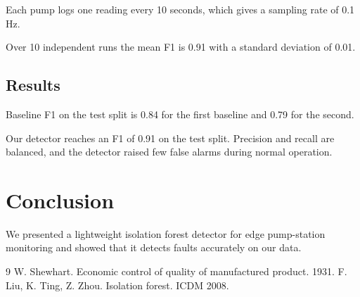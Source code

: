 \documentclass{article}
\begin{document}
Each pump logs one reading every 10 seconds, which gives a sampling rate of 0.1 Hz.

Over 10 independent runs the mean F1 is 0.91 with a standard deviation of 0.01.

\subsection{Results}
Baseline F1 on the test split is 0.84 for the first baseline and 0.79 for the second.

Our detector reaches an F1 of 0.91 on the test split. Precision and recall are balanced, and the detector raised few false alarms during normal operation.

\section{Conclusion}
We presented a lightweight isolation forest detector for edge pump-station monitoring and showed that it detects faults accurately on our data.

\begin{thebibliography}{9}
 W. Shewhart. Economic control of quality of manufactured product. 1931.
 F. Liu, K. Ting, Z. Zhou. Isolation forest. ICDM 2008.
\end{thebibliography}
\end{document}
